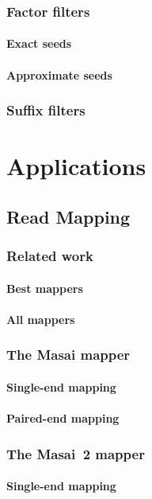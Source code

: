 \section{Factor filters}
\subsection{Exact seeds}
\subsection{Approximate seeds}
\section{Suffix filters}


\part{Applications}

\chapter{Read Mapping}
\section{Related work}
\subsection{Best mappers}
\subsection{All mappers}
\section{The Masai mapper}
\subsection{Single-end mapping}
\subsection{Paired-end mapping}
\section{The Masai~2 mapper}
\subsection{Single-end mapping}
